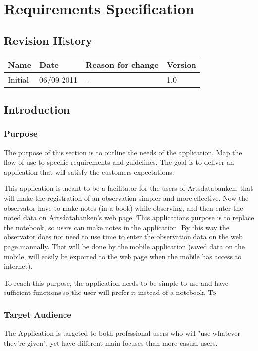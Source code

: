 \section{Requirements Specification}


\subsection{Revision History}
\begin{tabular}[t]{|l|l|l|l|}\hline
Name&Date&Reason for change&Version\\\hline\hline
Initial&06/09-2011&-&1.0\\\hline
\end{tabular}

\pagebreak

\subsection{ Introduction}

\subsubsection{ Purpose}
	The purpose of this section is to outline the needs of the application. Map the flow of use to specific requirements and guidelines. The goal is to deliver an application that will satisfy the customers expectations.  

This application is meant to be a facilitator for the users of Artsdatabanken, that will make the registration of an observation simpler and more effective. Now the observator have to make notes (in a book) while observing, and then enter the noted data on Artsdatabanken's web page. This applications purpose is to replace the notebook, so users can make notes in the application. By this way the observator does not need to use time to enter the observation data on the web page manually. That will be done by the mobile application (saved data on the mobile, will easily be exported to the web page when the mobile has access to internet). 

To reach this purpose, the application needs to be simple to use and have sufficient functions so the user will prefer it instead of a notebook. 
To  
\subsubsection{ Target Audience}
	The Application is targeted to both professional users who will "use whatever they're given", yet have different main focuses than more casual users.

